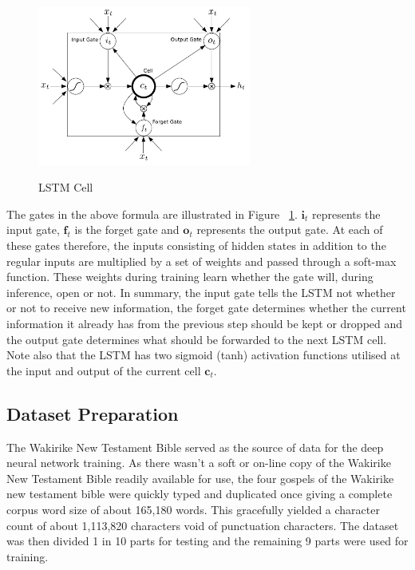 \documentclass[a4paper]{article}
\begin{document}
\begin{figure}
\centering
  \includegraphics[width=7cm]{lstmcell}\\
  \caption{LSTM Cell \cite{graves2013hybrid}}\label{fig1:lstmcell}
\end{figure}

The gates in the above formula are illustrated in Figure ~\ref{fig1:lstmcell}.  $\mathbf{i}_t$ represents the input gate, $\mathbf{f}_t$ is the forget gate and $\mathbf{o}_t$ represents the output gate.  At each of these gates therefore, the inputs consisting of hidden states in addition to the regular inputs are multiplied by a set of weights and passed through a soft-max function. These weights during training learn whether the gate will, during inference, open or not. In summary, the input gate tells the LSTM not whether or not to receive new information, the forget gate determines whether the current information it already has from the previous step should be kept or dropped and the output gate determines what should be forwarded to the next LSTM cell.  Note also that the LSTM has two sigmoid (tanh) activation functions utilised at the input and output of the current cell $\mathbf{c}_t$.

\subsection{Dataset Preparation}
The Wakirike New Testament Bible served as the source of data for the deep neural network training.  As there wasn't a soft or on-line copy of the Wakirike New Testament Bible readily available for use, the four gospels of the Wakirike new testament bible were quickly typed and duplicated once giving a complete corpus word size of about 165,180 words.  This gracefully yielded a character count of about 1,113,820 characters void of punctuation characters. The dataset was then divided 1 in 10 parts for testing and the remaining 9 parts were used for training.
\end{document}
